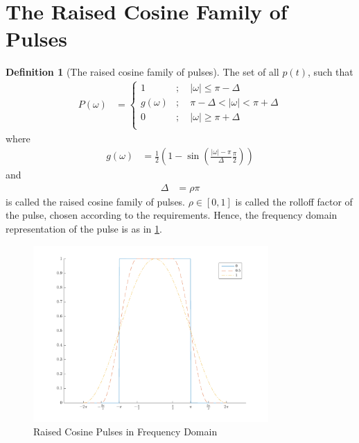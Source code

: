 \documentclass[titlepage, fleqn, a4paper, 12pt, twoside]{article}
\theoremstyle{definition}
\newtheorem{definition}{Definition}
\theoremstyle{theorem}
\begin{document}
\section{The Raised Cosine Family of Pulses}

\begin{definition}[The raised cosine family of pulses]
	The set of all $p(t)$, such that
	\begin{align*}
		P(\omega) &=
			\begin{cases}
				1 &;\quad |\omega| \le \pi - \Delta\\
				g(\omega) &;\quad \pi - \Delta < |\omega| < \pi + \Delta\\
				0 &;\quad |\omega| \ge \pi + \Delta\\
			\end{cases}
	\end{align*}
	where
	\begin{align*}
		g(\omega) &= \frac{1}{2} \left( 1 - \sin\left( \frac{|\omega| - \pi}{\Delta} \frac{\pi}{2} \right) \right)
	\end{align*}
	and
	\begin{align*}
		\Delta &= \rho \pi
	\end{align*}
	is called the raised cosine family of pulses.
	$\rho \in [0,1]$ is called the rolloff factor of the pulse, chosen according to the requirements.
	Hence, the frequency domain representation of the pulse is as in \cref{fig:raised_cosine_pulses_in_frequency_domain}.
	\begin{figure}[H]
		\centering
		\includegraphics[width = 0.8\textwidth]{./Plots/raised_cosine_pulses_in_frequency.pdf}
		\caption{Raised Cosine Pulses in Frequency Domain}
		\label{fig:raised_cosine_pulses_in_frequency_domain}
	\end{figure}
\end{definition}
\end{document}

